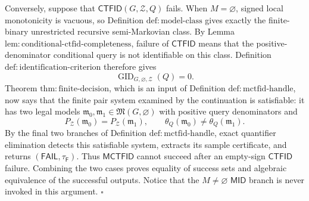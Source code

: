 Conversely, suppose that \(\mathsf{CTFID}(G,\mathcal Z,Q)\) fails.  When \(M=\varnothing\), signed local monotonicity is vacuous, so Definition \(\mathrm{def:model\text{-}class}\) gives exactly the finite-binary unrestricted recursive semi-Markovian class.  By Lemma \(\mathrm{lem:conditional\text{-}ctfid\text{-}completeness}\), failure of \(\mathsf{CTFID}\) means that the positive-denominator conditional query is not identifiable on this class.  Definition \(\mathrm{def:identification\text{-}criterion}\) therefore gives
\[
 \operatorname{GID}_{G,\varnothing,\mathcal Z}(Q)=0.
\]
Theorem \(\mathrm{thm:finite\text{-}decision}\), which is an input of Definition \(\mathrm{def:mctfid\text{-}handle}\), now says that the finite pair system examined by the continuation is satisfiable: it has two legal models \(\mathfrak m_0,\mathfrak m_1\in\mathfrak M(G,\varnothing)\) with positive query denominators and
\[
 P_{\mathcal Z}(\mathfrak m_0)=P_{\mathcal Z}(\mathfrak m_1),
 \qquad
 \theta_Q(\mathfrak m_0)\ne\theta_Q(\mathfrak m_1).
\]
By the final two branches of Definition \(\mathrm{def:mctfid\text{-}handle}\), exact quantifier elimination detects this satisfiable system, extracts its sample certificate, and returns \((\mathsf{FAIL},\tau_{\mathsf F})\).  Thus \(\mathsf{MCTFID}\) cannot succeed after an empty-sign \(\mathsf{CTFID}\) failure.  Combining the two cases proves equality of success sets and algebraic equivalence of the successful outputs.  Notice that the \(M\ne\varnothing\) \(\mathsf{MID}\) branch is never invoked in this argument. \(\square\)
